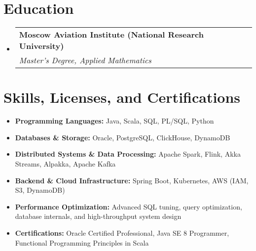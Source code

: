 \documentclass[letterpaper,11pt]{article}
\makeatletter
\newcommand{\resumeItem}[1]{
  \item\small{
    {#1 \vspace{-2pt}}
  }
}
\newcommand{\resumeSubheading}[4]{
  \vspace{-2pt}\item
    \begin{tabular*}{0.97\textwidth}[t]{l@{\extracolsep{\fill}}r}
      \textbf{#1} & #2 \\
      \textit{\small#3} & \textit{\small #4} \\
    \end{tabular*}\vspace{-7pt}
}
\newcommand{\resumeSubHeadingListStart}{\begin{itemize}[leftmargin=0.15in, label={}]}
\newcommand{\resumeSubHeadingListEnd}{\end{itemize}}
\newcommand{\resumeItemListStart}{\begin{itemize}}
\newcommand{\resumeItemListEnd}{\end{itemize}\vspace{-5pt}}
\makeatother
\begin{document}
\section{Education}
  \resumeSubHeadingListStart
    \resumeSubheading{Moscow Aviation Institute (National Research University)}{}{Master’s Degree, Applied Mathematics}{}
  \resumeSubHeadingListEnd

  \section{Skills, Licenses, and Certifications}  
  \resumeItemListStart  
    \resumeItem{\textbf{Programming Languages:} Java, Scala, SQL, PL/SQL, Python}  
    \resumeItem{\textbf{Databases \& Storage:} Oracle, PostgreSQL, ClickHouse, DynamoDB}  
    \resumeItem{\textbf{Distributed Systems \& Data Processing:} Apache Spark, Flink,  Akka Streams, Alpakka, Apache Kafka}  
    \resumeItem{\textbf{Backend \& Cloud Infrastructure:} Spring Boot, Kubernetes, AWS (IAM, S3, DynamoDB)}  
    \resumeItem{\textbf{Performance Optimization:} Advanced SQL tuning, query optimization, database internals, and high-throughput system design}  
    \resumeItem{\textbf{Certifications:} Oracle Certified Professional, Java SE 8 Programmer, Functional Programming Principles in Scala}  
  \resumeItemListEnd  
\end{document}
